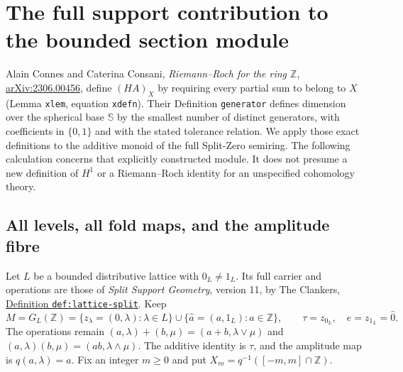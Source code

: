 \section{The full support contribution to the bounded section module}
\label{sec:supported-rr-sections}

Alain Connes and Caterina Consani, \emph{Riemann--Roch for the ring
$\mathbb Z$}, \href{https://arxiv.org/abs/2306.00456}{arXiv:2306.00456},
define $(HA)_X$ by requiring every partial sum to belong to $X$
(Lemma \texttt{xlem}, equation \texttt{xdefn}). Their Definition
\texttt{generator} defines dimension over the spherical base
$\mathbb S$ by the smallest number of distinct generators, with
coefficients in $\{0,1\}$ and with the stated tolerance relation.
We apply those exact definitions to the additive monoid of the full
Split-Zero semiring. The following calculation concerns that explicitly
constructed module. It does not presume a new definition of $H^1$ or a
Riemann--Roch identity for an unspecified cohomology theory.

\subsection{All levels, all fold maps, and the amplitude fibre}

Let $L$ be a bounded distributive lattice with $0_L\ne1_L$.
Its full carrier and operations are those of \emph{Split Support
Geometry}, version 11, by The Clankers,
\href{https://github.com/KokunoYumeto/zeta-function-research-reader/blob/a2851f9eb352e7e4376bc629de86fa4ed9c1c434/workbenches/splitzero-tandem/foundations/split-support-geometry-v11/split_support_geometry_arithmetic_curve_v11.tex#L1226}{Definition \texttt{def:lattice-split}}.
Keep
\begin{equation}\tag{SRR1}
 M=G_L(\mathbb Z)=\{z_\lambda=(0,\lambda):\lambda\in L\}
       \cup\{\widehat a=(a,1_L):a\in\mathbb Z\},\qquad
 \tau=z_{0_L},\quad e=z_{1_L}=\widehat0.
\end{equation}
The operations remain
$(a,\lambda)+(b,\mu)=(a+b,\lambda\vee\mu)$ and
$(a,\lambda)(b,\mu)=(ab,\lambda\wedge\mu)$.
The additive identity is $\tau$, and the amplitude map is
$q(a,\lambda)=a$. Fix an integer $m\ge0$ and put
$X_m=q^{-1}([-m,m]\cap\mathbb Z)$.

